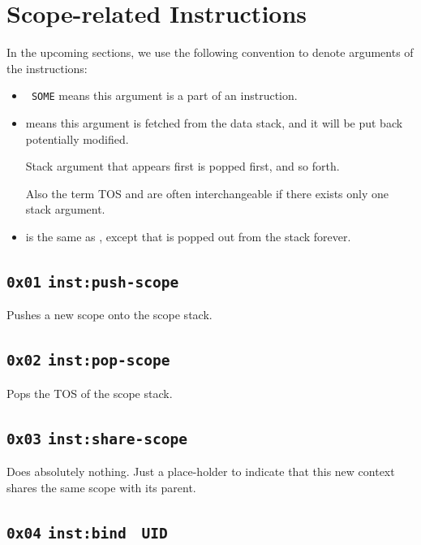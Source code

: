 \documentclass{report}
\newcommand{\mtilde}[1]{\textasciitilde}
\newcommand{\marg}[1]{\texttt{\mtilde ~#1}}
\newcommand{\inst}[1] {\texttt{inst:#1}}
\begin{document}
\section{Scope-related Instructions}

\begin{mdframed}[style=hint]
  In the upcoming sections, we use the following convention to denote arguments of the instructions:

  \begin{itemize}
  \item \marg{SOME} means this argument is a part of an instruction.
  \item {} means this argument is fetched from the data stack, and it will be put back potentially modified.

Stack argument that appears first is popped first, and so forth.

Also the term TOS and  are often interchangeable if there exists only one stack argument.
  \item {} is the same as , except that  is popped out from the stack forever.
  \end{itemize}
\end{mdframed}

\subsection{\texttt{0x01} \inst{push-scope}}

Pushes a new scope onto the scope stack.

\subsection{\texttt{0x02} \inst{pop-scope}}

Pops the TOS of the scope stack.

\subsection{\texttt{0x03} \inst{share-scope}}

Does absolutely nothing. Just a place-holder to indicate that this new context shares the same scope with its parent.

\subsection{\texttt{0x04} \inst{bind} \marg{UID}}
\end{document}
